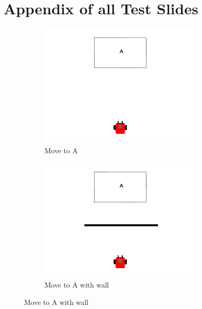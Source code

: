 \documentclass[]{article}
\begin{document}
\section{Appendix of all Test Slides}
\begin{figure}
	\centering
	\begin{subfigure}{0.42\textwidth}
		\centering
		\includegraphics[width=\linewidth]{slide_images/Swarm_Robot_Control_-_Single_Robot_0003.png}
		\caption{Move to A}
		\label{fig:sub1}
	\end{subfigure}%
	\begin{subfigure}{0.42\textwidth}
		\centering
		\includegraphics[width=\linewidth]{slide_images/Swarm_Robot_Control_-_Single_Robot_0005.png}
		\caption{Move to A with wall}

\end{subfigure}
\end{figure}
\end{document}

